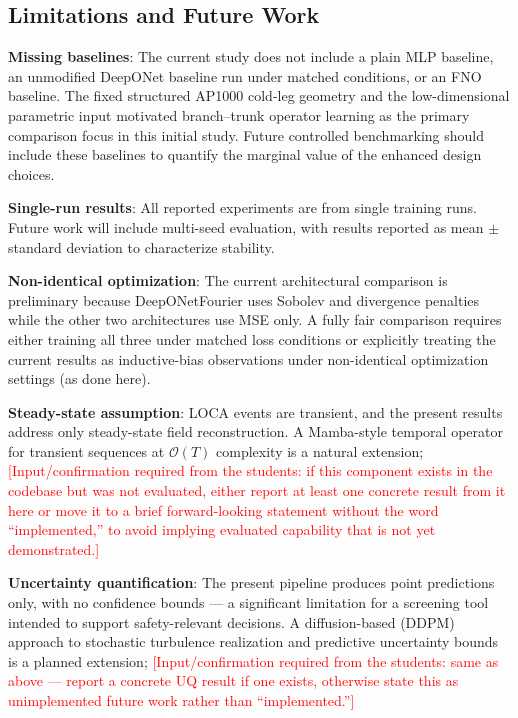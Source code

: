 \documentclass[journal]{IEEEtran}
\begin{document}
\subsection{Limitations and Future Work}
\label{sec:limitations}

\textbf{Missing baselines}: The current study does not include a plain MLP baseline, an unmodified DeepONet baseline run under matched conditions, or an FNO baseline. The fixed structured AP1000 cold-leg geometry and the low-dimensional parametric input motivated branch--trunk operator learning as the primary comparison focus in this initial study. Future controlled benchmarking should include these baselines to quantify the marginal value of the enhanced design choices.

\textbf{Single-run results}: All reported experiments are from single training runs. Future work will include multi-seed evaluation, with results reported as mean $\pm$ standard deviation to characterize stability.

\textbf{Non-identical optimization}: The current architectural comparison is preliminary because DeepONetFourier uses Sobolev and divergence penalties while the other two architectures use MSE only. A fully fair comparison requires either training all three under matched loss conditions or explicitly treating the current results as inductive-bias observations under non-identical optimization settings (as done here).

\textbf{Steady-state assumption}: LOCA events are transient, and the present results address only steady-state field reconstruction. A Mamba-style temporal operator for transient sequences at $\mathcal{O}(T)$ complexity is a natural extension; \textcolor{red}{[Input/confirmation required from the students: if this component exists in the codebase but was not evaluated, either report at least one concrete result from it here or move it to a brief forward-looking statement without the word ``implemented,'' to avoid implying evaluated capability that is not yet demonstrated.]}

\textbf{Uncertainty quantification}: The present pipeline produces point predictions only, with no confidence bounds --- a significant limitation for a screening tool intended to support safety-relevant decisions. A diffusion-based (DDPM) approach to stochastic turbulence realization and predictive uncertainty bounds is a planned extension; \textcolor{red}{[Input/confirmation required from the students: same as above --- report a concrete UQ result if one exists, otherwise state this as unimplemented future work rather than ``implemented.'']}
\end{document}
